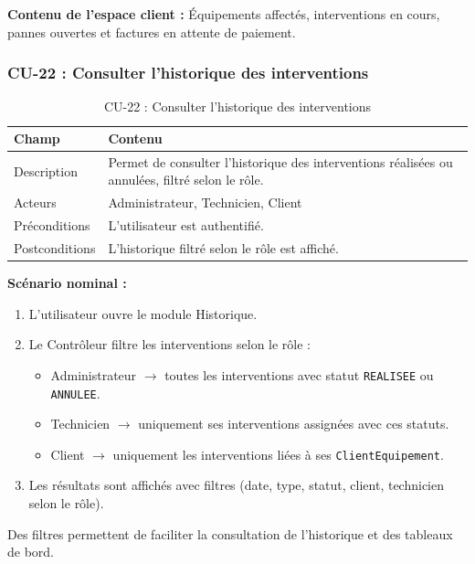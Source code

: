 \textbf{Contenu de l'espace client :} Équipements affectés, interventions en cours, pannes ouvertes et factures en attente de paiement.

\subsubsection{CU-22 : Consulter l'historique des interventions}

\begin{table}[H]
\centering
\caption{CU-22 : Consulter l'historique des interventions}
\label{tab:ch5:cu22}
\begin{tabular}{|p{3.5cm}|p{11cm}|}
\hline
\textbf{Champ} & \textbf{Contenu} \\
\hline
Description & Permet de consulter l'historique des interventions réalisées ou annulées, filtré selon le rôle. \\
\hline
Acteurs & Administrateur, Technicien, Client \\
\hline
Préconditions & L'utilisateur est authentifié. \\
\hline
Postconditions & L'historique filtré selon le rôle est affiché. \\
\hline
\end{tabular}
\end{table}

\textbf{Scénario nominal :}

\begin{enumerate}
    \item L'utilisateur ouvre le module Historique.
    \item Le Contrôleur filtre les interventions selon le rôle :
    \begin{itemize}
        \item Administrateur $\rightarrow$ toutes les interventions avec statut \texttt{REALISEE} ou \texttt{ANNULEE}.
        \item Technicien $\rightarrow$ uniquement ses interventions assignées avec ces statuts.
        \item Client $\rightarrow$ uniquement les interventions liées à ses \texttt{ClientEquipement}.
    \end{itemize}
    \item Les résultats sont affichés avec filtres (date, type, statut, client, technicien selon le rôle).
\end{enumerate}

Des filtres permettent de faciliter la consultation de l'historique et des tableaux de bord.

